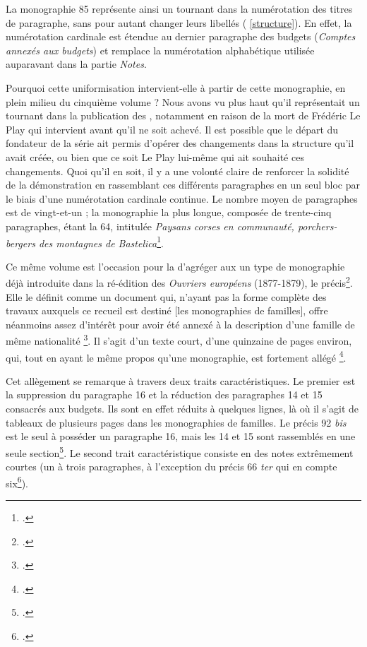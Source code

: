 La monographie \no{}85 représente ainsi un tournant dans la numérotation des titres de paragraphe, sans pour autant changer leurs libellés (\ann{} \ref{structure}). En effet, la numérotation cardinale est étendue au dernier paragraphe des budgets (\textit{Comptes annexés aux budgets}) et remplace la numérotation alphabétique utilisée auparavant dans la partie \textit{Notes}.

Pourquoi cette uniformisation intervient-elle à partir de cette monographie, en plein milieu du cinquième volume ? Nous avons vu plus haut qu'il représentait un tournant dans la publication des \odm, notamment en raison de la mort de Frédéric Le Play qui intervient avant qu'il ne soit achevé. Il est possible que le départ du fondateur de la série ait permis d'opérer des changements dans la structure qu'il avait créée, ou bien que ce soit Le Play lui-même qui ait souhaité ces changements. Quoi qu'il en soit, il y a une volonté claire de renforcer la solidité de la démonstration en rassemblant ces différents paragraphes en un seul bloc par le biais d'une numérotation cardinale continue. Le nombre moyen de paragraphes est de vingt-et-un ; la monographie la plus longue, composée de trente-cinq paragraphes, étant la \no{}64, intitulée \textit{Paysans corses en communauté, porchers-bergers des montagnes de Bastelica}\footcite{mono064a}.

Ce même volume est l'occasion pour la \sess{} d'agréger aux \odm{} un type de monographie déjà introduite dans la ré-édition des \textit{Ouvriers européens} (1877-1879), le précis\footcite[p. 102]{lorry}. Elle le définit comme un document qui, \og n'ayant pas la forme complète des travaux auxquels ce recueil est destiné [les monographies de familles], offre néanmoins assez d'intérêt pour avoir été annexé à la description d'une famille de même nationalité \fg{}\footcite[p. II]{averts2t1}. Il s'agit d'un texte court, d'une quinzaine de pages environ, qui, tout en ayant le même propos qu'une monographie, est fortement \og allégé \fg{}\footcite[p. 7]{chenu}.

Cet allègement se remarque à travers deux traits caractéristiques. Le premier est la suppression du paragraphe 16 et la réduction des paragraphes 14 et 15 consacrés aux budgets. Ils sont en effet réduits à quelques lignes, là où il s'agit de tableaux de plusieurs pages dans les  monographies de familles. Le précis \no{}92 \textit{bis} est le seul à posséder un paragraphe 16, mais les 14 et 15 sont rassemblés en une seule section\footcite[p. 78-81]{mono092b}. Le second trait caractéristique consiste en des notes extrêmement courtes (un à trois paragraphes, à l'exception du précis \no{}66 \textit{ter} qui en compte six\footcite[p. 158-172]{mono066c}).

